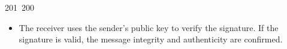 201~200~\documentclass{article}
\begin{document}
\begin{itemize}
	                                                                                                                                                                                                                                                                                                	                                                                                                                                        	    	                                                                                                	                                                                                                                                                                                                                                                                                                                                	                                                                        	                                                                        	                                                                                                                                        	                                                                                                                                                                                                                        	                                                                                                                            	                                                                	                                                                            \item The receiver uses the sender's public key to verify the signature. If the signature is valid, the message integrity and authenticity are confirmed.

\end{itemize}
\end{document}
